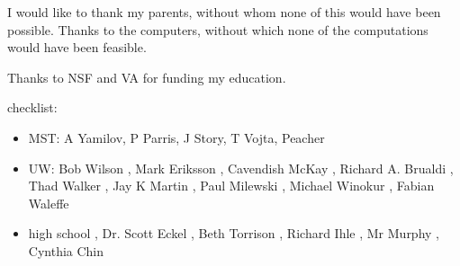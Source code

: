 
I would like to thank my parents, without whom none of this would have been possible. Thanks to the computers, without which none of the computations would have been feasible.

Thanks to NSF and VA for funding my education. 

checklist:
\begin{itemize}
\item MST: A Yamilov, P Parris, J Story, T Vojta, Peacher
\item UW: Bob Wilson %
, Mark Eriksson %
, Cavendish McKay %
, Richard A. Brualdi %
, Thad Walker %
, Jay K Martin %
, Paul Milewski %
, Michael Winokur %
, Fabian Waleffe %
\item high school
, Dr. Scott Eckel %
, Beth Torrison %
, Richard Ihle
, Mr Murphy
, Cynthia Chin %

\end{itemize}

